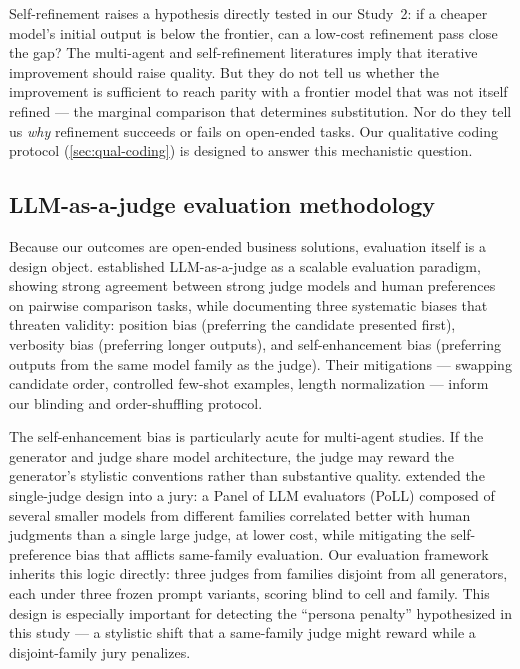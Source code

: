 \documentclass[12pt,a4paper]{article}
\begin{document}
Self-refinement raises a hypothesis directly tested in our Study~2: if a cheaper
model's initial output is below the frontier, can a low-cost refinement pass close
the gap? The multi-agent and self-refinement literatures imply that iterative
improvement should raise quality. But they do not tell us whether the
improvement is sufficient to reach parity with a frontier model that was not
itself refined --- the marginal comparison that determines substitution. Nor do
they tell us \emph{why} refinement succeeds or fails on open-ended tasks. Our
qualitative coding protocol (\cref{sec:qual-coding}) is designed to answer this
mechanistic question.

\subsection{LLM-as-a-judge evaluation methodology}

Because our outcomes are open-ended business solutions, evaluation itself is a
design object. \citet{ZhengEtAl2023} established LLM-as-a-judge as a scalable
evaluation paradigm, showing strong agreement between strong judge models and
human preferences on pairwise comparison tasks, while documenting three
systematic biases that threaten validity: position bias (preferring the
candidate presented first), verbosity bias (preferring longer outputs), and
self-enhancement bias (preferring outputs from the same model family as the
judge). Their mitigations --- swapping candidate order, controlled few-shot
examples, length normalization --- inform our blinding and order-shuffling
protocol.

The self-enhancement bias is particularly acute for multi-agent studies. If the
generator and judge share model architecture, the judge may reward the
generator's stylistic conventions rather than substantive quality.
\citet{VergaEtAl2024} extended the single-judge design into a jury: a Panel of
LLM evaluators (PoLL) composed of several smaller models from different
families correlated better with human judgments than a single large judge, at
lower cost, while mitigating the self-preference bias that afflicts same-family
evaluation. Our evaluation framework inherits this logic directly: three judges
from families disjoint from all generators, each under three frozen prompt
variants, scoring blind to cell and family. This design is especially important
for detecting the ``persona penalty'' hypothesized in this study --- a stylistic
shift that a same-family judge might reward while a disjoint-family jury
penalizes.
\end{document}
